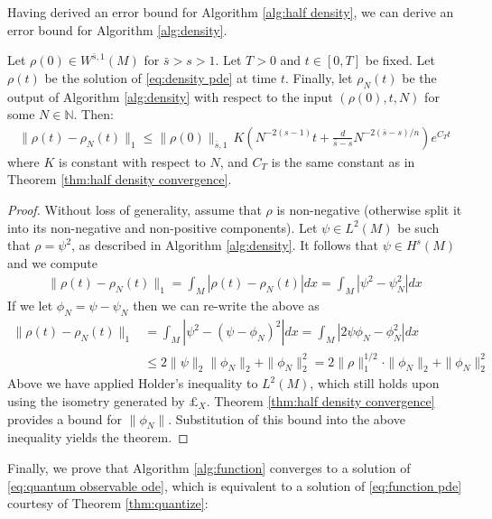 \documentclass[final,leqno]{siamart}
\begin{document}
Having derived an error bound for Algorithm \ref{alg:half density}, we can derive an error bound for Algorithm \ref{alg:density}.

\begin{theorem} \label{thm:density convergence}
	Let $\rho(0) \in W^{\bar{s},1}(M)$ for $\bar{s} > s >1$.
	Let $T > 0$ and $t \in [0,T]$ be fixed.
	Let $\rho(t)$ be the solution of \eqref{eq:density pde} at time $t$.
	Finally, let $\rho_{N}(t)$ be the output of Algorithm \ref{alg:density} with respect to the input $(\rho(0), t , N)$ for some $N \in \mathbb{N}$.
	Then:
	\begin{align*}
		\| \rho(t) - \rho_{N}(t) \|_{1} \leq \| \rho(0) \|_{\bar{s},1} \, K \left( N^{-2(s-1)} t+  \frac{d}{\bar{s}-s} N^{-2(\bar{s}-s)/n} \right) e^{C_{T} t}
	\end{align*}
	where $K$ is constant with respect to $N$, and $C_{T}$ is the same constant as in Theorem \ref{thm:half density convergence}.
\end{theorem}

\begin{proof}
	Without loss of generality, assume that $\rho$ is non-negative (otherwise split it into its non-negative and non-positive components).
	Let $\psi \in L^{2}(M)$ be such that $\rho =  \psi ^{2}$, as described in Algorithm \ref{alg:density}.
	It follows that $\psi \in H^{s}(M)$ and we compute
	\begin{align*}
		\| \rho(t) - \rho_{N}(t) \|_{1} = \int_{M} | \rho(t) - \rho_{N}(t)| dx = \int_{M} | \psi^{2} - \psi_{N}^{2} | dx
	\end{align*}
	If we let $\phi_{N} = \psi - \psi_{N}$ then we can re-write the above as
	\begin{align*}
		\| \rho(t) - \rho_{N}(t) \|_{1}  &= \int_{M} | \psi^{2} - (\psi - \phi_{N})^{2} | dx= \int_{M} | 2 \psi \phi_{N} - \phi_{N}^{2} | dx \\
			&\leq 2 \| \psi \|_{2} \| \phi_{N}\|_{2} + \| \phi_{N} \|_{2}^{2} = 2 \| \rho \|_{1}^{1/2} \cdot \| \phi_{N} \|_{2} + \| \phi_{N} \|_{2}^{2}
	\end{align*}
	Above we have applied Holder's inequality to $L^{2}(M)$, which still holds upon using the isometry generated by $\pounds_X$.
	Theorem \ref{thm:half density convergence} provides a bound for $\| \phi_{N} \|$.
	Substitution of this bound into the above inequality yields the theorem.
\end{proof}

Finally, we prove that Algorithm \ref{alg:function} converges to a solution of \eqref{eq:quantum observable ode}, which is equivalent to a solution of \eqref{eq:function pde} courtesy of Theorem \ref{thm:quantize}:
\end{document}
